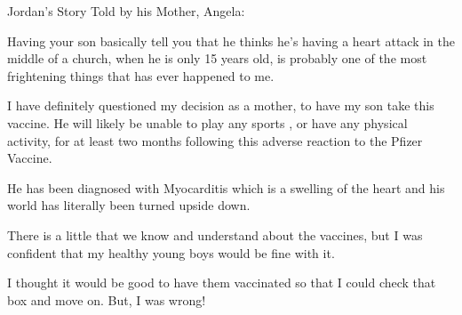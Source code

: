 Jordan’s Story Told by his Mother, Angela:

Having your son basically tell you that he thinks he’s having a heart attack in
the middle of a church, when he is only 15 years old, is probably one of the
most frightening things that has ever happened to me.

I have definitely questioned my decision as a mother, to have my son take this
vaccine. He will likely be unable to play any sports , or have any physical
activity, for at least two months following this adverse reaction to the Pfizer
Vaccine.

He has been diagnosed with Myocarditis which is a swelling of the heart and his
world has literally been turned upside down.

There is a little that we know and understand about the vaccines, but I was
confident that my healthy young boys would be fine with it.

I thought it would be good to have them vaccinated so that I could check that
box and move on. But, I was wrong!

